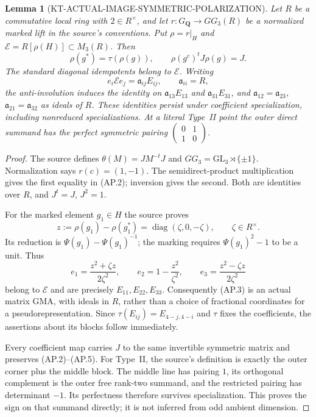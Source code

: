 \documentclass[11pt,a4paper]{article}
\newtheorem{lemma}[theorem]{Lemma}
\theoremstyle{definition}
\begin{document}
\begin{lemma}[KT-ACTUAL-IMAGE-SYMMETRIC-POLARIZATION]
Let $R$ be a commutative local ring with $2\in R^\times$, and
let $r:G_{\mathbf Q}\to GG_3(R)$ be a normalized marked lift
in the source's conventions.  Put $\rho=r|_H$ and
$\mathcal E=R[\rho(H)]\subset M_3(R)$.  Then
\[
 \rho(g^*)=\tau(\rho(g)),\qquad
 \rho(g^c)^tJ\rho(g)=J.                                     \tag{AP.2}
\]
The standard diagonal idempotents belong to $\mathcal E$.
Writing
\[
 e_i\mathcal E e_j=\mathfrak a_{ij}E_{ij},\qquad
 \mathfrak a_{ii}=R,                                        \tag{AP.3}
\]
the anti-involution induces the identity on
$\mathfrak a_{13}E_{13}$ and $\mathfrak a_{31}E_{31}$, and
$\mathfrak a_{12}=\mathfrak a_{23}$,
$\mathfrak a_{21}=\mathfrak a_{32}$ as ideals of $R$.
These identities persist under coefficient specialization,
including nonreduced specializations.  At a literal Type~II
point the outer direct summand has the perfect symmetric
pairing $\left(\begin{smallmatrix}0&1\\1&0\end{smallmatrix}\right)$.
\end{lemma}

\begin{proof}
The source defines $\theta(M)=JM^{-t}J$ and
$GG_3=\mathrm{GL}_3\rtimes\{\pm1\}$.  Normalization says
$r(c)=(1,-1)$.  The semidirect-product multiplication gives
the first equality in (AP.2); inversion gives the second.
Both are identities over $R$, and $J^t=J$, $J^2=1$.

For the marked element $g_1\in H$ the source proves
\[
 z:=\rho(g_1)-\rho(g_1^*)
       =\operatorname{diag}(\zeta,0,-\zeta),\qquad
 \zeta\in R^\times.                                        \tag{AP.4}
\]
Its reduction is $\Psi(g_1)-\Psi(g_1)^{-1}$; the marking
requires $\Psi(g_1)^2-1$ to be a unit.  Thus
\[
 e_1=\frac{z^2+\zeta z}{2\zeta^2},\qquad
 e_2=1-\frac{z^2}{\zeta^2},\qquad
 e_3=\frac{z^2-\zeta z}{2\zeta^2}                            \tag{AP.5}
\]
belong to $\mathcal E$ and are precisely $E_{11},E_{22},E_{33}$.
Consequently (AP.3) is an actual matrix GMA, with ideals in
$R$, rather than a choice of fractional coordinates for a
pseudorepresentation.  Since
$\tau(E_{ij})=E_{4-j,4-i}$ and $\tau$ fixes the coefficients,
the assertions about its blocks follow immediately.

Every coefficient map carries $J$ to the same invertible
symmetric matrix and preserves (AP.2)--(AP.5).  For Type~II,
the source's definition is exactly the outer corner plus the
middle block.  The middle line has pairing $1$, its orthogonal
complement is the outer free rank-two summand, and the
restricted pairing has determinant $-1$.  Its perfectness
therefore survives specialization.  This proves the sign on
that summand directly; it is not inferred from odd ambient
dimension.
\end{proof}
\end{document}
